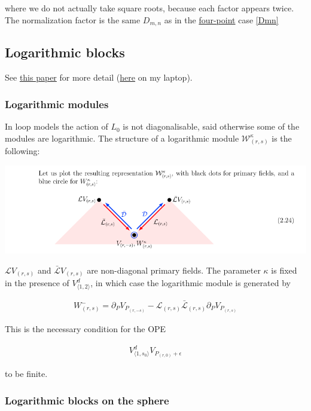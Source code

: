 \documentclass[a4paper]{article}
\numberwithin{equation}{section}
\begin{document}
where we do not actually take square roots, because each factor appears twice. The normalization factor is the same \(D_{m,n}\) as in the \hyperref[Dmn]{four-point} case \ref{Dmn}
\subsection{Logarithmic blocks}
\label{sec:org6c3126b}

See \href{https://arxiv.org/abs/2007.04190}{this paper} for more detail (\href{file:///Users/Paul/Downloads/log\_CFT\_ribault\_nivesvivat.pdf}{here} on my laptop).
\subsubsection*{Logarithmic modules}
\label{sec:orgd273264}

In loop models the action of \(L_0\) is not diagonalisable, said otherwise some of the modules are logarithmic.
The structure of a logarithmic module \(\mathcal W^\kappa_{(r,s)}\) is the following:

\begin{center}
\includegraphics[width=.9\linewidth]{./imgs/logarithmic_module.png}
\end{center}

\(\mathcal L V_{(r,s)}\) and \(\bar{\mathcal L} V_{(r,s)}\) are non-diagonal primary fields. The parameter \(\kappa\) is fixed in the presence of \(V^d_{\langle1,2\rangle}\), in which case the logarithmic module is generated by

\begin{align}
  W^{-}_{(r,s)} = \partial_{P} V_{P_{(r,-s)}} - \mathcal{L}_{(r,s)} \bar{\mathcal{L}}_{(r,s)} \partial_{P} V_{P_{(r,s)}}
\end{align}

This is the necessary condition for the OPE

\begin{align}
  V^{d}_{\langle 1,s_{0}\rangle} V_{P_{(r,0)}+\epsilon}
\end{align}

to be finite.
\subsubsection*{Logarithmic blocks on the sphere}
\label{sec:org48ae354}
\end{document}
